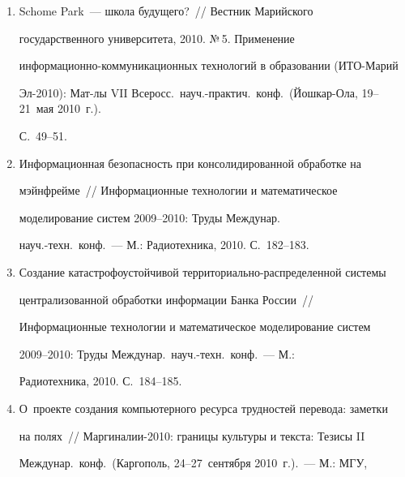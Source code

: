 \begin{enumerate}[1.]
учебных материалов нового поколения в образовательном процессе 


(ИТО-Томск-2010): Мат-лы Всеросс.\  науч.-практич.\ конф.\  (Томск, 


23--25~марта 2010~г.).~--- Томск: Открытый молодежный университет, 2010. 


С.~63--66.


\item {}


Schome Park~--- школа будущего?~/\!\!/  Вестник Марийского 


государственного университета, 2010. №\,5. Применение 


информационно-коммуникационных технологий в образовании (ИТО-Марий 


Эл-2010): Мат-лы VII Всеросс.\  науч.-практич.\ конф.\  (Йошкар-Ола, 19--21~мая 2010~г.). 


С.~49--51.


\item {}


Информационная безопасность при консолидированной обработке на 


мэйнфрейме~/\!\!/  Информационные технологии и математическое 


моделирование сис\-тем 2009--2010: Труды Междунар.\ 


науч.-техн.\ конф.~--- М.: Радиотехника, 2010. С.~182--183.


\item {}


Создание катастрофоустойчивой территориально-рас\-пре\-де\-лен\-ной сис\-темы 


централизованной обработки информации Банка России~/\!\!/  


Информационные технологии и математическое моделирование сис\-тем 


2009--2010: Труды Междунар.\ науч.-техн.\ конф.~--- М.: 


Радиотехника, 2010. С.~184--185.


\item {}


О~проекте создания компьютерного ресурса трудностей перевода: заметки 


на полях~/\!\!/  Маргиналии-2010: границы культуры и текста: Тезисы II 


Междунар.\ конф.\ (Каргополь, 24--27~сентября 2010~г.).~--- М.: МГУ, 



\end{enumerate}
